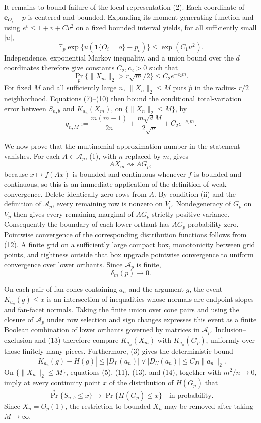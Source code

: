 It remains to bound failure of the local representation (2).  Each coordinate of \(\mathbf e_{O_i}-p\) is centered and bounded.  Expanding its moment generating function and using \(e^v\leq1+v+C v^2\) on a fixed bounded interval yields, for all sufficiently small \(|u|\),
\[
\mathbb E_p\exp\{u(\mathbf 1\{O_i=o\}-p_o)\}\leq\exp(C_1u^2).
\]
Independence, exponential Markov inequality, and a union bound over the \(d\) coordinates therefore give constants \(C_2,c_2>0\) such that
\[
\Pr_p\{\|X_m\|_2>r\sqrt m/2\}\leq C_2e^{-c_2m}.
\tag{10}
\]
For fixed \(M\) and all sufficiently large \(n\), \(\|X_n\|_2\leq M\) puts \(\widehat p\) in the radius-
\(r/2\) neighborhood.  Equations (7)--(10) then bound the conditional total-variation error between \(S_{n,b}\) and \(K_{a_n}(X_m)\), on \(\{\|X_n\|_2\leq M\}\), by
\[
q_{n,M}:=\frac{m(m-1)}{2n}+\frac{m\sqrt d M}{2\sqrt n}+C_2e^{-c_2m}.
\tag{11}
\]

We now prove that the multinomial approximation number in the statement vanishes.  For each \(A\in\mathcal A_p\), (1), with \(n\) replaced by \(m\), gives
\[
AX_m\rightsquigarrow AG_p,
\tag{12}
\]
because \(x\mapsto f(Ax)\) is bounded and continuous whenever \(f\) is bounded and continuous, so this is an immediate application of the definition of weak convergence.
Delete identically zero rows from \(A\).  By condition (ii) and the definition of \(\mathcal A_p\), every remaining row is nonzero on \(V_p\).  Nondegeneracy of \(G_p\) on \(V_p\) then gives every remaining marginal of \(AG_p\) strictly positive variance.  Consequently the boundary of each lower orthant has \(AG_p\)-probability zero.  Pointwise convergence of the corresponding distribution functions follows from (12).  A finite grid on a sufficiently large compact box, monotonicity between grid points, and tightness outside that box upgrade pointwise convergence to uniform convergence over lower orthants.  Since \(\mathcal A_p\) is finite,
\[
\delta_m(p)\longrightarrow0.
\tag{13}
\]

On each pair of fan cones containing \(a_n\) and the argument \(g\), the event \(K_{a_n}(g)\leq x\) is an intersection of inequalities whose normals are endpoint slopes and fan-facet normals.  Taking the finite union over cone pairs and using the closure of \(\mathcal A_p\) under row selection and sign changes expresses this event as a finite Boolean combination of lower orthants governed by matrices in \(\mathcal A_p\).  Inclusion--exclusion and (13) therefore compare \(K_{a_n}(X_m)\) with \(K_{a_n}(G_p)\), uniformly over those finitely many pieces.  Furthermore, (3) gives the deterministic bound
\[
|K_{a_n}(g)-H(g)|
\leq |D_L(a_n)|\vee|D_U(a_n)|
\leq C_D\|a_n\|_2.
\tag{14}
\]
On \(\{\|X_n\|_2\leq M\}\), equations (5), (11), (13), and (14), together with \(m^2/n\to0\), imply at every continuity point \(x\) of the distribution of \(H(G_p)\) that
\[
\Pr^*\{S_{n,b}\leq x\}\longrightarrow
\Pr\{H(G_p)\leq x\}
\quad\text{in probability}.
\tag{15}
\]
Since \(X_n=O_p(1)\), the restriction to bounded \(X_n\) may be removed after taking \(M\to\infty\).

